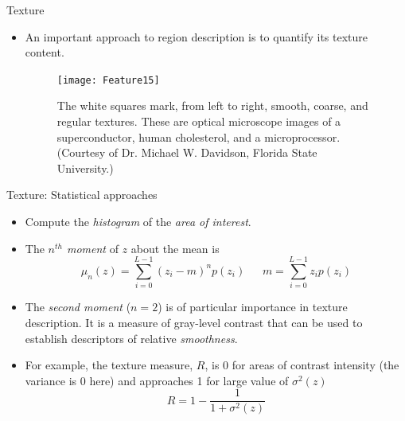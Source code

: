 \begin{frame}{Texture}
\begin{itemize}
\item An important approach to region description is 
to quantify its texture content.
\begin{figure}
\texttt{[image: Feature15]}
\caption{The white squares mark, from left to
right, smooth, coarse, and regular textures. These are optical microscope images of a superconductor, human cholesterol, and a
microprocessor. (Courtesy of Dr. Michael W.
Davidson, Florida State University.)}
\end{figure}
\end{itemize}
\end{frame}

\begin{frame}{Texture: Statistical approaches}
\begin{itemize}
\item Compute the \textit{\color{mycolor1}histogram} of the \textit{\color{mycolor1}area of interest}.
\item The \textit{\color{mycolor1}$n^{th}$ moment} of $z$ about the mean is
\[\boxed{{\mu _n}(z) = \sum\limits_{i = 0}^{L - 1} {{{({z_i} - m)}^n}p({z_i})}}~~~~~~~\boxed{m = \sum\limits_{i = 0}^{L - 1} {{z_i}p({z_i})}}  \]
\item The \textit{\color{mycolor1}second moment} ($n=2$) is of particular importance in 
texture description. It is a measure of gray-level contrast that can be used 
to establish descriptors of relative \textit{\color{mycolor1}smoothness}.
\item  For example, the texture measure, $R$, is 0 for areas of contrast intensity (the variance is 0 here) and approaches 1 for 
large value of $\sigma^2(z)$
\[\boxed{R=1-\frac{1}{1+\sigma^2(z)}}\]
\end{itemize}
\end{frame}

